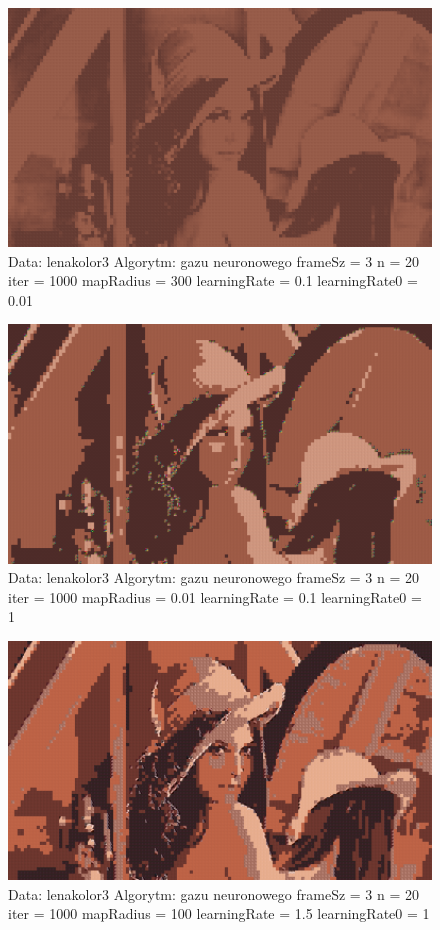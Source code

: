 \documentclass{classrep}
\begin{document}
{{{\newpage

\begin{figure}[h!]
\centering
 \includegraphics[width=12cm]{img/neural_3.png}
 \vspace{-0.0cm}
 \caption{Data: lenakolor3 Algorytm: gazu neuronowego frameSz = 3 n = 20 iter = 1000 mapRadius = 300 learningRate = 0.1 learningRate0  = 0.01
}
\end{figure}

\begin{figure}[h!]
\centering
 \includegraphics[width=12cm]{img/neural_4.png}
 \vspace{-0.0cm}
 \caption{Data: lenakolor3 Algorytm: gazu neuronowego frameSz = 3 n = 20 iter = 1000 mapRadius = 0.01 learningRate = 0.1 learningRate0  = 1
}
\end{figure}

\newpage

\begin{figure}[h!]
\centering
 \includegraphics[width=12cm]{img/neural_5.png}
 \vspace{-0.0cm}
 \caption{Data: lenakolor3 Algorytm: gazu neuronowego frameSz = 3 n = 20 iter = 1000 mapRadius = 100 learningRate = 1.5 learningRate0  = 1
}
\end{figure}
}

}}
\end{document}
